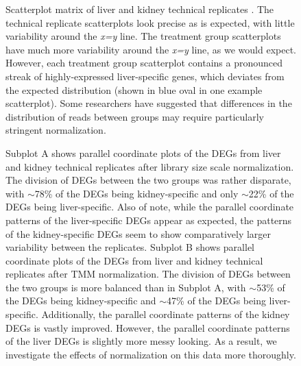\documentclass{bmcart}
\begin{document}
\begin{linenumbers}
\begin{backmatter}
\begin{figure}[h!]
\caption{
Scatterplot matrix of liver and kidney technical replicates \cite{Marioni}. The technical replicate scatterplots look precise as is expected, with little variability around the \textit{x=y} line. The treatment group scatterplots have much more variability around the \textit{x=y} line, as we would expect. However, each treatment group scatterplot contains a pronounced streak of highly-expressed liver-specific genes, which deviates from the expected distribution (shown in blue oval in one example scatterplot). Some researchers have suggested that differences in the distribution of reads between groups may require particularly stringent normalization.
\label{lkSM}}
\end{figure}

\begin{figure}[h!]
\caption{
Subplot A shows parallel coordinate plots of the DEGs from liver and kidney technical replicates \cite{Marioni} after library size scale normalization. The division of DEGs between the two groups was rather disparate, with $\sim$78\% of the DEGs being kidney-specific and only $\sim$22\% of the DEGs being liver-specific. Also of note, while the parallel coordinate patterns of the liver-specific DEGs appear as expected, the patterns of the kidney-specific DEGs seem to show comparatively larger variability between the replicates. Subplot B shows parallel coordinate plots of the DEGs from liver and kidney technical replicates after TMM normalization. The division of DEGs between the two groups is more balanced than in Subplot A, with $\sim$53\% of the DEGs being kidney-specific and $\sim$47\% of the DEGs being liver-specific. Additionally, the parallel coordinate patterns of the kidney DEGs is vastly improved. However, the parallel coordinate patterns of the liver DEGs is slightly more messy looking. As a result, we investigate the effects of normalization on this data more thoroughly.
\label{lkClusters}}
\end{figure}


\end{backmatter}
\end{linenumbers}
\end{document}
